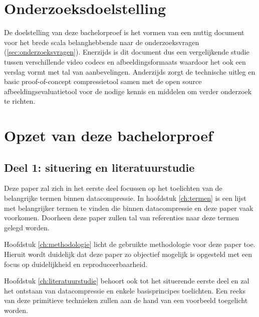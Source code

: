 \section{Onderzoeksdoelstelling}
\label{sec:onderzoeksdoelstelling}

De doelstelling van deze bachelorproef is het vormen van een nuttig document voor het brede scala belanghebbende naar de onderzoeksvragen (\ref{sec:onderzoeksvragen}). Enerzijds is dit document dus een vergelijkende studie tussen verschillende video \glspl{codec} en \glspl{afbeeldingsformaat} waardoor het ook een verslag vormt met tal van aanbevelingen. Anderzijds zorgt de technische uitleg en basic proof-of-concept \gls{compressietool} samen met de open source \gls{afbeeldingsevaluatietool} voor de nodige kennis en middelen om verder onderzoek te richten.


\section{Opzet van deze bachelorproef}
\label{sec:opzet-bachelorproef}
\subsection{Deel 1: situering en literatuurstudie}
\label{sec:opzet-bachelorproef-deel-1}

Deze paper zal zich in het eerste deel focussen op het toelichten van de belangrijke termen binnen \gls{datacompressie}. In hoofdstuk \ref{ch:termen} is een lijst met belangrijker termen te vinden die binnen \gls{datacompressie} en deze paper vaak voorkomen. Doorheen deze paper zullen tal van referenties naar deze termen gelegd worden. 

Hoofdstuk \ref{ch:methodologie} licht de gebruikte methodologie voor deze paper toe. Hieruit wordt duidelijk dat deze paper zo objectief mogelijk is opgesteld met een focus op duidelijkheid en reproduceerbaarheid.

Hoofdstuk \ref{ch:literatuurstudie} behoort ook tot het situerende eerste deel en zal het ontstaan van \gls{datacompressie} en enkele basisprincipes toelichten. Een reeks van deze primitieve technieken zullen aan de hand van een voorbeeld toegelicht worden.

